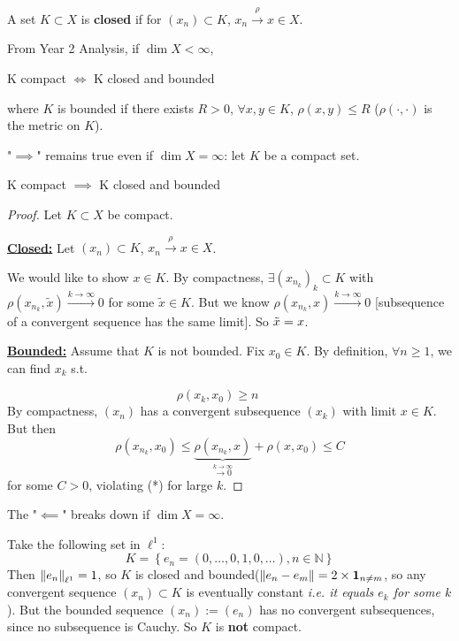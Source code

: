 \documentclass{article}
\begin{document}
\begin{definition}[Closed]\nextline
    A set $K \subset X$ is \textbf{closed} if for $(x_n) \subset K$, $x_n \overset{\rho}{\longrightarrow} x \in X$.
\end{definition}


\begin{remark}
    From Year 2 Analysis, if $\dim X < \infty$,  
    \begin{center}
        K compact $\iff$ K closed and bounded
    \end{center}
    where $K$ is bounded if there exists $R>0$, $\forall x,y \in K$, $\rho(x,y) \leq R$ ($\rho(\cdot, \cdot)$ is the metric on $K$). 
\end{remark}  

\begin{remark}
    "$\implies$" remains true even if $\dim X = \infty$: let $K$ be a compact set.
\end{remark}

\begin{proposition}
\label{comapct implies ...}
    K compact $\implies$ K closed and bounded
\end{proposition}
\begin{proof}
Let $K\subset X$ be compact.  

\underline{\textbf{Closed:}}\nextline  
Let $(x_n) \subset K$, $x_n \overset{\rho}{\longrightarrow} x \in X$.  

We would like to show $x \in K$. By compactness, $\exists (x_{n_k})_k \subset K$ with $\rho(x_{n_k}, \tilde{x}) \overset{k\to \infty}{\longrightarrow} 0$ for some $\tilde{x} \in K$. But we know $\rho(x_{n_k}, x)\overset{k\to \infty}{\longrightarrow} 0$ [subsequence of a convergent sequence has the same limit]. So $\Tilde{x}=x$. 

\underline{\textbf{Bounded:}}\nextline
Assume that $K$ is not bounded. Fix $x_0 \in K$. By definition, $\forall n \geq 1$, we can find $x_k$ s.t. 

$$
\rho(x_k, x_0) \geq n \qquad
$$  
By compactness, $(x_n)$ has a convergent subsequence $(x_k)$ with limit $x \in K$. But then 
$$
\rho(x_{n_k}, x_0) \leq \underbrace{\rho(x_{n_k}, x)}_{\overset{k \to \infty}{\longrightarrow 0}} + \rho(x, x_0) \leq C
$$
for some $C>0$, violating (*) for large $k$.
\end{proof}

The "$\impliedby$" breaks down if $\dim X = \infty$.

\begin{example}
    Take the following set in $\ell^1$:  
    \begin{equation*}
        K = \left\{ e_n = (0, \ldots, 0, 1, 0, \ldots), n \in \mathbb{N} \right\}
    \end{equation*}  
    Then $\left\|{e_n}\right\|_{\ell^1}=1$, so $K$ is closed and bounded($\left\|{e_n-e_m}\right\| = 2 \times \mathbf{1}_{n\neq m}$, so any convergent sequence $(x_n) \subset K$ is eventually constant \textit{i.e. it equals $e_k$ for some $k$}). But the bounded sequence $(x_n) := (e_n)$ has no convergent subsequences, since no subsequence is Cauchy. So $K$ is \textbf{not} compact.
\end{example}  
\end{document}
